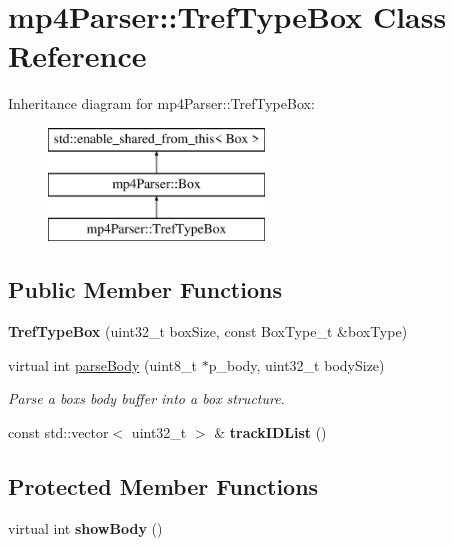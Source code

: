 \hypertarget{classmp4_parser_1_1_tref_type_box}{}\section{mp4\+Parser\+::Tref\+Type\+Box Class Reference}
\label{classmp4_parser_1_1_tref_type_box}
Inheritance diagram for mp4\+Parser\+::Tref\+Type\+Box\+:\begin{figure}[H]
\begin{center}
\leavevmode
\includegraphics[height=3.000000cm]{classmp4_parser_1_1_tref_type_box}
\end{center}
\end{figure}
\subsection*{Public Member Functions}
\begin{DoxyCompactItemize}
\item 
\mbox{\label{classmp4_parser_1_1_tref_type_box_a4fdbfd03c6a3d61738fb953494cf8e08}} 
{\bfseries Tref\+Type\+Box} (uint32\+\_\+t box\+Size, const Box\+Type\+\_\+t \&box\+Type)
\item 
virtual int \mbox{\hyperlink{classmp4_parser_1_1_tref_type_box_aacb791855bbbc8fd86092257f18e9889}{parse\+Body}} (uint8\+\_\+t $\ast$p\+\_\+body, uint32\+\_\+t body\+Size)
\begin{DoxyCompactList}\small\item\em Parse a box\textquotesingle{}s body buffer into a box structure. \end{DoxyCompactList}\item 
\mbox{\label{classmp4_parser_1_1_tref_type_box_a4165876da2a879b4a5e2b8bcf6db5e55}} 
const std\+::vector$<$ uint32\+\_\+t $>$ \& {\bfseries track\+I\+D\+List} ()
\end{DoxyCompactItemize}
\subsection*{Protected Member Functions}
\begin{DoxyCompactItemize}
\item 
\mbox{\label{classmp4_parser_1_1_tref_type_box_aa8b0846db930156555a71cfd576ed102}} 
virtual int {\bfseries show\+Body} ()
\end{DoxyCompactItemize}
